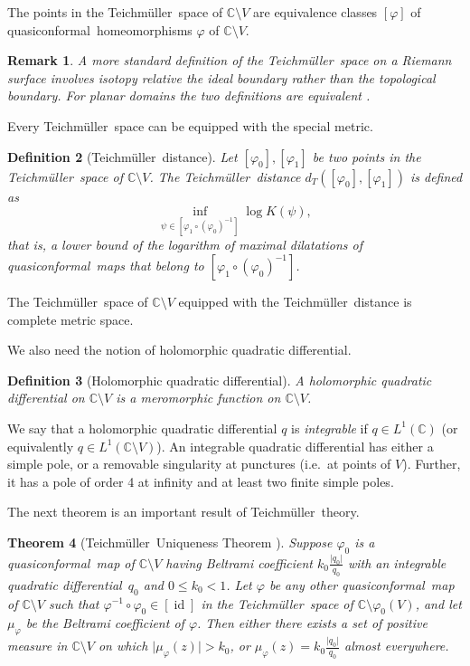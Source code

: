 \documentclass[10pt,reqno,a4paper]{amsart}
\numberwithin{figure}{section}
\numberwithin{equation}{section}
\newtheorem{thm}{Theorem}[section]
\newtheorem{defn}[thm]{Definition}
\newtheorem{remark}[thm]{Remark}
\newcommand{\tei}{Teichm\"uller}
\newcommand{\qc}{quasiconformal}
\newcommand{\qd}{quadratic differential}
\newcommand{\id}{\operatorname{id}}
\newcommand{\abs}[1]{\lvert #1 \rvert}
\begin{document}
The points in the \tei\ space of $\mathbb{C}\setminus V$ are equivalence classes $[\varphi]$ of \qc\ homeomorphisms $\varphi$ of $\mathbb{C}\setminus V$. 

\begin{remark}
	A more standard definition of the \tei\ space on a Riemann surface involves isotopy relative the \emph{ideal boundary} rather than the topological boundary. For planar domains the two definitions are equivalent \cite{Gardiner}.
\end{remark}

Every \tei\ space can be equipped with the special metric.

\begin{defn}[\tei\ distance]
	Let $[\varphi_0],[\varphi_1]$ be two points in the \tei\ space of $\mathbb{C}\setminus V$. The \tei\ distance $d_T([\varphi_0],[\varphi_1])$ is defined as	
	$$\inf\limits_{\psi\in [\varphi_1\circ (\varphi_0)^{-1}]} \log K(\psi),$$
	that is, a lower bound of the logarithm of maximal dilatations of \qc\ maps that belong to $[\varphi_1\circ (\varphi_0)^{-1}]$.
\end{defn}

The \tei\ space of $\mathbb{C}\setminus V$ equipped with the \tei\ distance is complete metric space.

We also need the notion of holomorphic quadratic differential.

\begin{defn}[Holomorphic \qd]
	A \emph{holomorphic quadratic differential} on $\mathbb{C}\setminus V$ is a meromorphic function on $\mathbb{C}\setminus V$.
\end{defn}

We say that a holomorphic quadratic differential $q$ is \emph{integrable} if $q\in L^1(\mathbb{C})$ (or equivalently $q\in L^1(\mathbb{C}\setminus V)$). An integrable quadratic differential has either a simple pole, or a removable singularity at punctures (i.e.\ at points of $V$). Further, it has a pole of order 4 at infinity and at least two finite simple poles.


The next theorem is an important result of \tei\ theory.

\begin{thm}[\tei\ Uniqueness Theorem \cite{Gardiner}]
	\label{thm:teich_uniqueness}
	Suppose $\varphi_0$ is a \qc\ map of $\mathbb{C}\setminus V$ having Beltrami coefficient $k_0 \frac{\abs{q_0}}{q_0}$ with an integrable \qd\ $q_0$ and $0\leq k_0<1$. Let $\varphi$ be any other \qc\ map of $\mathbb{C}\setminus V$ such that $\varphi^{-1}\circ \varphi_0\in[\id]$ in the \tei\ space of $\mathbb{C}\setminus \varphi_0(V)$, and let $\mu_\varphi$ be the Beltrami coefficient of $\varphi$. Then either there exists a set of positive measure in $\mathbb{C}\setminus V$ on which $\abs{\mu_\varphi(z)}>k_0$, or $\mu_\varphi(z)=k_0 \frac{\abs{q_0}}{q_0}$ almost everywhere.
\end{thm}
\end{document}
